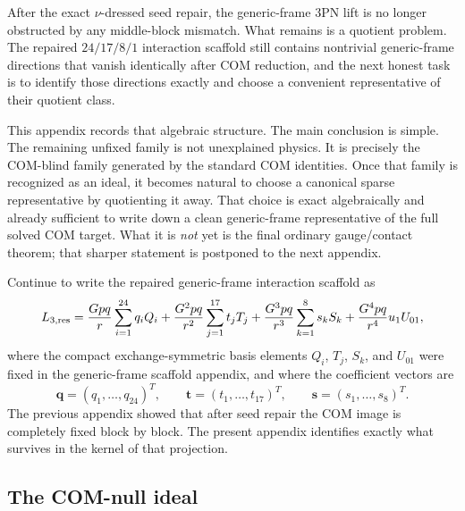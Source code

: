 \documentclass[11pt]{article}
\begin{document}
After the exact $\nu$-dressed seed repair, the generic-frame $3$PN lift is no
longer obstructed by any middle-block mismatch.  What remains is a quotient
problem.  The repaired $24/17/8/1$ interaction scaffold still contains
nontrivial generic-frame directions that vanish identically after COM
reduction, and the next honest task is to identify those directions exactly and
choose a convenient representative of their quotient class.

This appendix records that algebraic structure.  The main conclusion is simple.
The remaining unfixed family is not unexplained physics.  It is precisely the
COM-blind family generated by the standard COM identities.  Once that family is
recognized as an ideal, it becomes natural to choose a canonical sparse
representative by quotienting it away.  That choice is exact algebraically and
already sufficient to write down a clean generic-frame representative of the
full solved COM target.  What it is \emph{not} yet is the final ordinary
gauge/contact theorem; that sharper statement is postponed to the next
appendix.

Continue to write the repaired generic-frame interaction scaffold as
\begin{equation}
L_{3,\rm res}
=
\frac{Gpq}{r}\sum_{i=1}^{24} q_i Q_i
+\frac{G^2pq}{r^2}\sum_{j=1}^{17} t_j T_j
+\frac{G^3pq}{r^3}\sum_{k=1}^{8} s_k S_k
+\frac{G^4pq}{r^4}u_1 U_{01},
\label{eq:app-com-null-residual-scaffold}
\end{equation}
where the compact exchange-symmetric basis elements $Q_i$, $T_j$, $S_k$, and
$U_{01}$ were fixed in the generic-frame scaffold appendix, and where the
coefficient vectors are
\begin{equation}
\mathbf q=(q_1,\dots,q_{24})^T,
\qquad
\mathbf t=(t_1,\dots,t_{17})^T,
\qquad
\mathbf s=(s_1,\dots,s_8)^T.
\label{eq:app-com-null-coeff-vectors}
\end{equation}
The previous appendix showed that after seed repair the COM image is completely
fixed block by block.  The present appendix identifies exactly what survives in
the kernel of that projection.

\subsection{The COM-null ideal}
\label{app:com-null-ideal}
\end{document}
